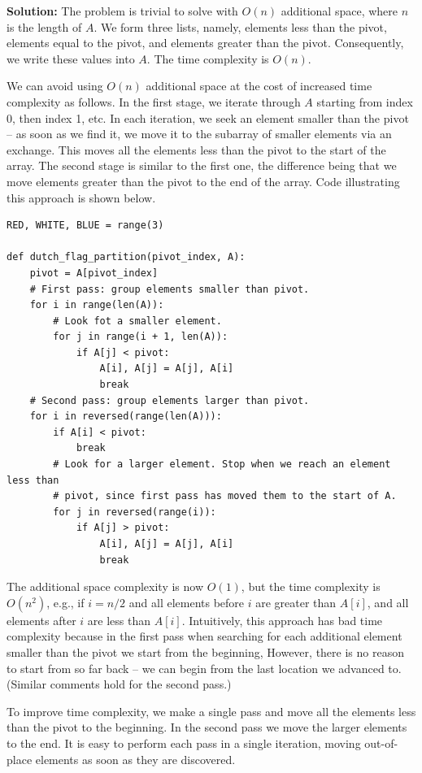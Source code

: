 \documentclass[11pt,a4paper]{article}
\begin{document}
\textbf{Solution:} The problem is trivial to solve with $O(n)$ additional
space, where $n$ is the length of $A$. We form three lists, namely, elements
less than the pivot, elements equal to the pivot, and elements greater than
the pivot. Consequently, we write these values into $A$. The time complexity
is $O(n)$.

We can avoid using $O(n)$ additional space at the cost of increased time
complexity as follows. In the first stage, we iterate through $A$ starting
from index 0, then index 1, etc. In each iteration, we seek an element smaller
than the pivot -- as soon as we find it, we move it to the subarray of smaller
elements via an exchange. This moves all the elements less than the pivot to
the start of the array. The second stage is similar to the first one, the
difference being that we move elements greater than the pivot to the end of
the array. Code illustrating this approach is shown below.

\begin{verbatim}
RED, WHITE, BLUE = range(3)

def dutch_flag_partition(pivot_index, A):
    pivot = A[pivot_index]
    # First pass: group elements smaller than pivot.
    for i in range(len(A)):
        # Look fot a smaller element.
        for j in range(i + 1, len(A)):
            if A[j] < pivot:
                A[i], A[j] = A[j], A[i]
                break
    # Second pass: group elements larger than pivot.
    for i in reversed(range(len(A))):
        if A[i] < pivot: 
            break
        # Look for a larger element. Stop when we reach an element less than 
        # pivot, since first pass has moved them to the start of A.
        for j in reversed(range(i)):
            if A[j] > pivot:
                A[i], A[j] = A[j], A[i]
                break
\end{verbatim}

The additional space complexity is now $O(1)$, but the time complexity is
$O(n^2)$, e.g., if $i = n/2$ and all elements before $i$ are greater than
$A[i]$, and all elements after $i$ are less than $A[i]$. Intuitively, this
approach has bad time complexity because in the first pass when searching for
each additional element smaller than the pivot we start from the beginning,
However, there is no reason to start from so far back -- we can begin from the
last location we advanced to. (Similar comments hold for the second pass.)

To improve time complexity, we make a single pass and move all the elements
less than the pivot to the beginning. In the second pass we move the larger
elements to the end. It is easy to perform each pass in a single iteration,
moving out-of-place elements as soon as they are discovered.
\end{document}
